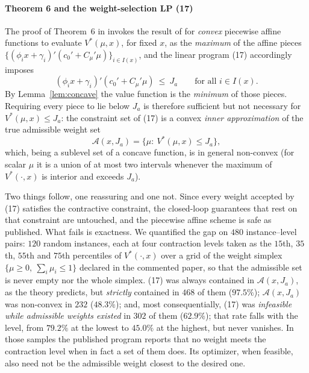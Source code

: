 \documentclass[review]{elsarticle}
\begin{document}
\paragraph{Theorem 6 and the weight-selection LP (17)}
The proof of Theorem~6 in \citep{bemporad2009} invokes the result of
\citet{schechter1987} for \emph{convex} piecewise affine functions to evaluate
$V^\ast(\mu,x)$, for fixed $x$, as the \emph{maximum} of the affine pieces
$\{(\phi_i x+\gamma_i)'(c_0'+C_\mu'\mu)\}_{i\in I(x)}$, and the linear program
(17) accordingly imposes
\[
(\phi_i x+\gamma_i)'(c_0'+C_\mu'\mu)\ \le\ J_a
\qquad\text{for all } i\in I(x).
\]
By Lemma~\ref{lem:concave} the value function is the \emph{minimum} of those
pieces. Requiring every piece to lie below $J_a$ is therefore sufficient but
not necessary for $V^\ast(\mu,x)\le J_a$: the constraint set of (17) is a
convex \emph{inner approximation} of the true admissible weight set
\[
\mathcal{A}(x,J_a)=\{\mu:\ V^\ast(\mu,x)\le J_a\},
\]
which, being a sublevel set of a concave function, is in general non-convex
(for scalar $\mu$ it is a union of at most two intervals whenever the maximum
of $V^\ast(\cdot,x)$ is interior and exceeds $J_a$).

Two things follow, one reassuring and one not. Since every weight accepted by
(17) satisfies the contractive constraint, the closed-loop guarantees that
rest on that constraint are untouched, and the piecewise affine scheme is safe
as published. What fails is exactness. We quantified the gap on $480$
instance--level pairs: $120$ random instances, each at four contraction levels
taken as the $15$th, $35$th, $55$th and $75$th percentiles of $V^\ast(\cdot,x)$
over a grid of the weight simplex $\{\mu\ge0,\ \sum_i\mu_i\le 1\}$ declared in
the commented paper, so that the admissible set is never empty nor the whole
simplex. (17) was always contained in
$\mathcal{A}(x,J_a)$, as the theory predicts, but \emph{strictly} contained in
$468$ of them ($97.5\%$); $\mathcal{A}(x,J_a)$ was non-convex in $232$
($48.3\%$); and, most consequentially, (17) was \emph{infeasible while
admissible weights existed} in $302$ of them ($62.9\%$); that rate falls with
the level, from $79.2\%$ at the lowest to $45.0\%$ at the highest, but never
vanishes. In those samples the
published program reports that no weight meets the contraction level when in
fact a set of them does. Its optimizer, when feasible, also need not be the
admissible weight closest to the desired one.
\end{document}
